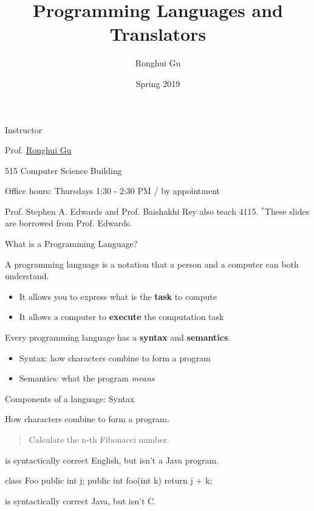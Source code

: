 \documentclass{plt}
\title{Programming Languages and Translators}
\author{Ronghui Gu}
\institute{Columbia University}
\date{Spring 2019}
\begin{document}
\frame{\titlepage}

\begin{frame}{Instructor}

\baselineskip

Prof. \href{http://guronghui.com}{\textcolor{mBlue}{Ronghui Gu}}

515 Computer Science Building



Office hours: Thursdays 1:30 - 2:30 PM / by appointment

\vfill


\vfill
\small{Prof. Stephen A. Edwards and Prof. Baishakhi Rey also teach 4115.}
\small{$^*$These slides are borrowed from Prof. Edwards.}

\end{frame}

\begin{frame}[fragile]{What is a Programming Language?}

A programming language is a notation that  a person and a computer can both understand.
\begin{itemize}

\item It allows you to express what is the \textbf{task} to compute

\item It allows a computer to \textbf{execute} the computation task

\end{itemize}


Every  programming language has a \textbf{syntax} and \textbf{semantics}.
\begin{itemize}

\item Syntax: how characters combine to form a program

\item Semantics: what the program \emph{means}

\end{itemize}

\end{frame}


\begin{frame}[fragile]{Components of a language: Syntax}

\alert{How characters combine to form a program.}

\begin{quote}
Calculate the n-th Fibonacci number.
\end{quote}

is syntactically correct English, but isn't a Java program.

\begin{java}
class Foo {
  public int j;
  public int foo(int k) { return j + k; }
}
\end{java}

is syntactically correct Java, but isn't C.

\end{frame}
\end{document}

